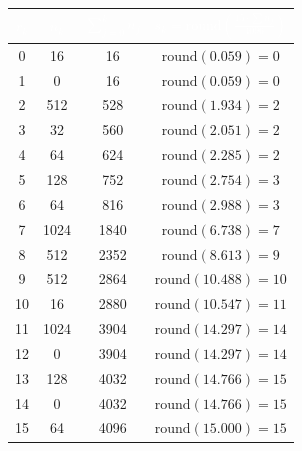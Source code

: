 \documentclass[12pt]{article}
\begin{document}
\begin{stepbox}
\begin{center}
\begin{tabular}{c c c c}
\rowcolor{USC_Garnet!80}
\textcolor{white}{$r_k$} & \textcolor{white}{$n_k$} & \textcolor{white}{$\displaystyle\sum_{j=0}^{k} n_j$} & \textcolor{white}{$s_k = \text{round}\!\left(\frac{15 \cdot \sum n_j}{4096}\right)$} \\
\hline
0  & 16   & 16   & $\text{round}(0.059) = 0$  \\
1  & 0    & 16   & $\text{round}(0.059) = 0$  \\
2  & 512  & 528  & $\text{round}(1.934) = 2$  \\
3  & 32   & 560  & $\text{round}(2.051) = 2$  \\
4  & 64   & 624  & $\text{round}(2.285) = 2$  \\
5  & 128  & 752  & $\text{round}(2.754) = 3$  \\
6  & 64   & 816  & $\text{round}(2.988) = 3$  \\
7  & 1024 & 1840 & $\text{round}(6.738) = 7$  \\
8  & 512  & 2352 & $\text{round}(8.613) = 9$  \\
9  & 512  & 2864 & $\text{round}(10.488) = 10$ \\
10 & 16   & 2880 & $\text{round}(10.547) = 11$ \\
11 & 1024 & 3904 & $\text{round}(14.297) = 14$ \\
12 & 0    & 3904 & $\text{round}(14.297) = 14$ \\
13 & 128  & 4032 & $\text{round}(14.766) = 15$ \\
14 & 0    & 4032 & $\text{round}(14.766) = 15$ \\
15 & 64   & 4096 & $\text{round}(15.000) = 15$ \\
\hline
\end{tabular}
\end{center}
\end{stepbox}
\end{document}
